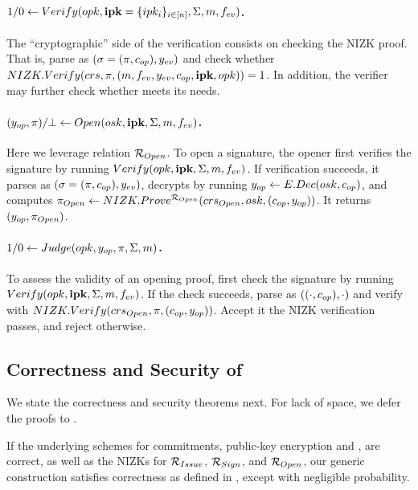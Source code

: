 \paragraph{$1/0 \gets Verify(opk,\mathbf{ipk}=\lbrace ipk_i\rbrace_{i\in[n]},
  \Sigma,m,f_{ev})$.} %
The ``cryptographic'' side of the verification consists on checking
the NIZK proof. That is, parse \Sig as $(\sigma = (\pi,c_{op}),y_{ev})$ and
check whether $NIZK.Verify(crs,\pi,(m,f_{ev},y_{ev},
c_{op},\mathbf{ipk},opk)) = 1$. In addition, the verifier may further check
whether \yeval meets its needs.

\paragraph{$(y_{op},\pi)/\bot \gets
  Open(osk,\mathbf{ipk},\Sigma,m,f_{ev})$.} %
Here we leverage relation $\mathcal{R}_{Open}$.
%
To open a signature, the opener first verifies the signature by running $Verify
(opk,\mathbf{ipk}, \Sigma,m,f_{ev})$. If verification succeeds, it parses
\Sig as $(\sigma=(\pi,c_{op}),y_{ev})$, decrypts \Ec by running $y_{op}
\gets E.Dec(osk,c_{op})$, and computes $\pi_{Open} \gets
NIZK.Prove^{\mathcal{R}_{Open}}(crs_{Open},osk,(c_{op},y_{op}))$. It
returns $(y_{op},\pi_{Open})$.

\paragraph{$1/0 \gets Judge(opk,y_{op},\pi,\Sigma,m)$.} %
To assess the validity of an opening proof, first check the signature
by running $Verify(opk,\mathbf{ipk},\Sigma,m,f_{ev})$. If the check succeeds,
parse \Sig as $((\cdot,c_{op}),\cdot)$ and verify \NIZKproof with
$NIZK.Verify(crs_{Open},\pi,(c_{op},y_{op}))$. Accept it the NIZK
verification passes, and reject otherwise.

\subsection{Correctness and Security of \CUASGen}
\label{ssec:security-uas}

We state the correctness and security theorems next. For lack of space, we defer
the proofs to .

\begin{theorem}
  \label{thm:correctness-uas}
  If the underlying schemes for commitments, public-key encryption and \SBCM,
  are correct, as well as the NIZKs for $\mathcal{R}_{Issue}$, $\mathcal{R}_{Sign}$,
  and $\mathcal{R}_{Open}$, our generic construction \CUASGen satisfies
  correctness as defined in , except with negligible
  probability.
\end{theorem}


